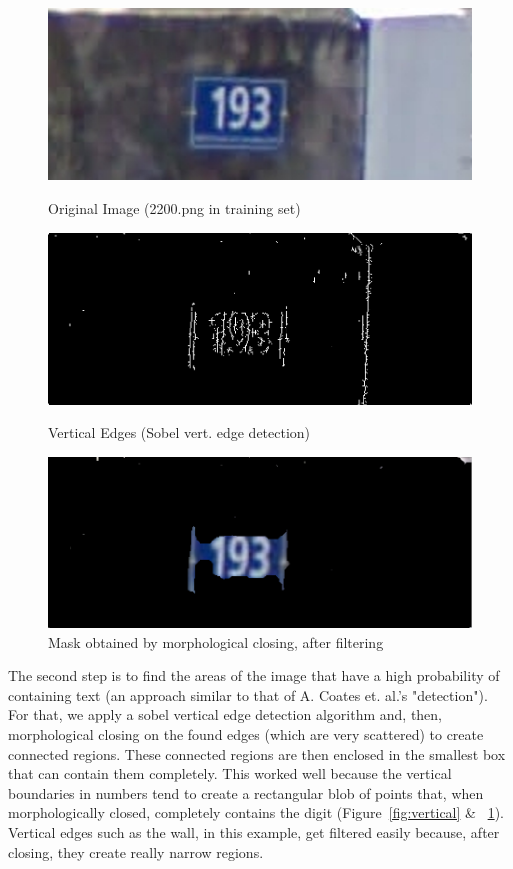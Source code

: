 \documentclass{article} %
\begin{document}
\begin{figure}[!htb]
  \includegraphics[width=\linewidth]{images/image02}
  \caption{Original Image (2200.png in training set)}
  \label{fig:orig}
\endminipage\hfill
{}
  \includegraphics[width=\linewidth]{images/image06}
  \caption{Vertical Edges (Sobel vert. edge detection)}
  \label{fig:vertical}
\endminipage\hfill
{}%
  \includegraphics[width=\linewidth]{images/image00}
  \caption{Mask obtained by morphological closing, after filtering}
  \label{fig:mask}
\endminipage
\end{figure}

The second step is to find the areas of the image that have a high probability of containing text (an approach similar to that of A. Coates et. al.'s "detection"\cite{coates2011text}). For that, we apply a sobel vertical edge detection algorithm and, then, morphological closing on the found edges (which are very scattered) to create connected regions. These connected regions are then enclosed in the smallest box that can contain them completely. This worked well because the vertical boundaries in numbers tend to create a rectangular blob of points that, when morphologically closed, completely contains the digit (Figure~\ref{fig:vertical} \& ~\ref{fig:mask}). Vertical edges such as the wall, in this example, get filtered easily because, after closing, they create really narrow regions.
\end{document}
